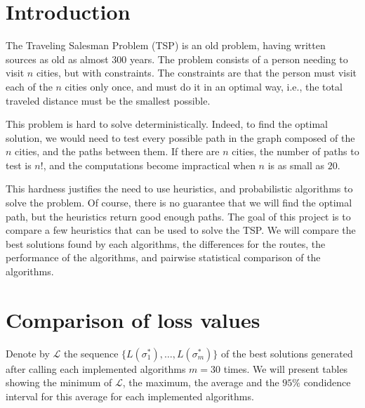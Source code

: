 \documentclass[a4paper, 11pt]{scrartcl}
\title{\vspace{-1cm}\normalfont{\bfseries{Probabilistic Algorithms Project \\ {\Large Comparing heuristics for
      TSP}}}}
\author{Laurent \textsc{Hayez}}
\date{\today}%
\begin{document}
\renewcommand{\labelitemi}{\textbullet}

\maketitle

\thispagestyle{fancy}



\section{Introduction}

The Traveling Salesman Problem (TSP) is an old problem, having written sources as old as almost 300 years. The
problem consists of a person needing to visit $n$ cities, but with constraints. The constraints are that the
person must visit each of the $n$ cities only once, and must do it in an optimal way, i.e., the total
traveled distance must be the smallest possible.

This problem is hard to solve deterministically. Indeed, to find the optimal solution, we would need to test
every possible path in the graph composed of the $n$ cities, and the paths between them. If there are $n$
cities, the number of paths to test is $n!$, and the computations become impractical when $n$ is as small as
$20$. 

This hardness justifies the need to use heuristics, and probabilistic algorithms to solve the problem. Of
course, there is no guarantee that we will find the optimal path, but the heuristics return good enough
paths. The goal of this project is to compare a few heuristics that can be used to solve the TSP. We will
compare the best solutions found by each algorithms, the differences for the routes, the performance of the
algorithms, and pairwise statistical comparison of the algorithms. 

\section{Comparison of loss values}

Denote by $\mathcal{L}$ the sequence $\{L(\sigma_1^{\ast}), \ldots, L(\sigma_m^{\ast})\}$ of the best
solutions generated after calling each implemented algorithms $m = 30$ times. We will present tables showing
the minimum of $\mathcal{L}$, the maximum, the average and the $95\%$ condidence interval for this average for
each implemented algorithms.
\end{document}

